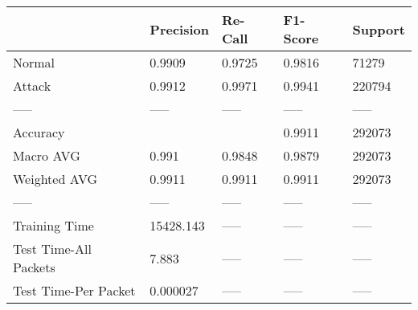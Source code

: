 \begin{tabular}{lllll}
\toprule
{} &  Precision & Re-Call & F1-Score & Support \\
\midrule
Normal                &     0.9909 &  0.9725 &   0.9816 &   71279 \\
Attack                &     0.9912 &  0.9971 &   0.9941 &  220794 \\
-----                 &      ----- &   ----- &    ----- &   ----- \\
Accuracy              &            &         &   0.9911 &  292073 \\
Macro AVG             &      0.991 &  0.9848 &   0.9879 &  292073 \\
Weighted AVG          &     0.9911 &  0.9911 &   0.9911 &  292073 \\
-----                 &      ----- &   ----- &    ----- &   ----- \\
Training Time         &  15428.143 &   ----- &    ----- &   ----- \\
Test Time-All Packets &      7.883 &   ----- &    ----- &   ----- \\
Test Time-Per Packet  &   0.000027 &   ----- &    ----- &   ----- \\
\bottomrule
\end{tabular}
